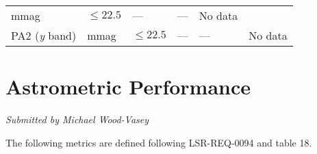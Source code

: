 \documentclass[DM,toc]{lsstdoc}
\begin{document}
\begin{longtable}[]{@{}llllll@{}}
\begin{minipage}[t]{0.06\columnwidth}
mmag\strut
\end{minipage} & \begin{minipage}[t]{0.17\columnwidth}\raggedright\strut
\(\leq 22.5\)\strut
\end{minipage} & \begin{minipage}[t]{0.17\columnwidth}\raggedright\strut
---\strut
\end{minipage} & \begin{minipage}[t]{0.12\columnwidth}\raggedright\strut
---\strut
\end{minipage} & \begin{minipage}[t]{0.17\columnwidth}\raggedright\strut
No data\strut
\end{minipage}\tabularnewline
\begin{minipage}[t]{0.14\columnwidth}\raggedright\strut
PA2 (\emph{y} band)\strut
\end{minipage} & \begin{minipage}[t]{0.06\columnwidth}\raggedright\strut
mmag\strut
\end{minipage} & \begin{minipage}[t]{0.17\columnwidth}\raggedright\strut
\(\leq 22.5\)\strut
\end{minipage} & \begin{minipage}[t]{0.17\columnwidth}\raggedright\strut
---\strut
\end{minipage} & \begin{minipage}[t]{0.12\columnwidth}\raggedright\strut
---\strut
\end{minipage} & \begin{minipage}[t]{0.17\columnwidth}\raggedright\strut
No data\strut
\end{minipage}\tabularnewline
\bottomrule
\end{longtable}

\section{Astrometric Performance}\label{astrometric-performance}

\emph{Submitted by Michael Wood-Vasey}

The following metrics are defined following LSR-REQ-0094
 and  table 18.
\end{document}
